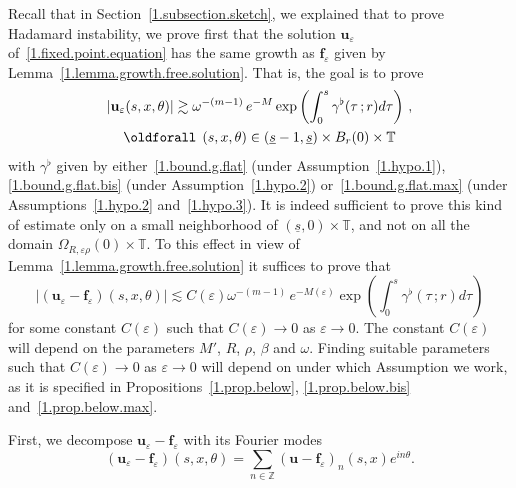 \documentclass[10pt]{amsart}
\theoremstyle{definition}
\theoremstyle{plain}
\newcommand*\e{\varepsilon}
\newcommand*\Z{{\mathbb Z}}
\newcommand*\g{\gamma}
\newcommand{\ubf}{{\mathbf u}}
\newcommand*\f{{\mathbf f}}
\newcommand*\und{\underline}
\renewcommand*{\forall}{\mathrel{\oldforall}}
\begin{document}
Recall that in Section~\ref{1.subsection.sketch}, we explained that to prove Hadamard instability, we prove first that the solution $\ubf_{\e}$ of~\eqref{1.fixed.point.equation} has the same growth as $\f_{\e}$ given by Lemma~\ref{1.lemma.growth.free.solution}. That is, the goal is to prove
\begin{multline}\label{1.growth.solution}
|\ubf_{\e}(s,x,\theta)| \gtrsim \omega^{-(m-1)}\,e^{-M} \exp \left(\int_{0}^{s} \g^{\flat}(\tau \,;r) d\tau \right)\,,\\
\forall\,(s,x,\theta) \in (\und{s} - 1, \und{s})\times B_{r}(0) \times\mathbb{T}
\end{multline}
with $\g^{\flat}$ given by either~\eqref{1.bound.g.flat} (under Assumption~\ref{1.hypo.1}), \eqref{1.bound.g.flat.bis} (under Assumption~\ref{1.hypo.2}) or~\eqref{1.bound.g.flat.max} (under Assumptions~\ref{1.hypo.2} and~\ref{1.hypo.3}). It is indeed sufficient to prove this kind of estimate only on a small neighborhood of $(\und{s},0)\times\mathbb{T}$, and not on all the domain $\Omega_{R,\e\rho}(0)\times\mathbb{T} $. To this effect in view of Lemma~\ref{1.lemma.growth.free.solution} it suffices to prove that
\begin{equation}\label{1.esti.Ceps}
|(\ubf_{\e}-\f_{\e})(s,x,\theta)| \lesssim C(\e)\omega^{-(m-1)}\,e^{-M(\e)} \exp \left(\int_{0}^{s} \g^{\flat}(\tau \,;r) d\tau \right)
\end{equation}
for some constant $C(\e)$ such that $C(\e) \to 0$ as $\e \to 0$. The constant $C(\e)$ will depend on the parameters $M'$, $R$, $\rho$, $\beta$ and $\omega$. Finding suitable parameters such that $C(\e) \to 0$ as $\e \to 0$ will depend on under which Assumption we work, as it is specified in Propositions~\ref{1.prop.below}, \ref{1.prop.below.bis} and~\ref{1.prop.below.max}.

First, we decompose $\ubf_{\e}-\f_{\e}$ with its Fourier modes
\[
(\ubf_{\e}-\f_{\e})(s,x,\theta) = \sum_{n\in\Z} (\ubf-\f_{\e})_n(s,x) e^{in\theta}.
\]
\end{document}
